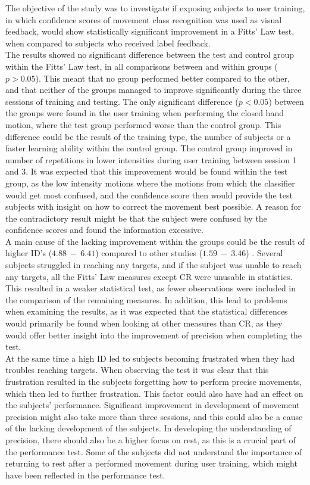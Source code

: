 The objective of the study was to investigate if exposing subjects to user training, in which confidence scores of movement class recognition was used as visual feedback, would show statistically significant improvement in a Fitts' Law test, when compared to subjects who received label feedback. \\
The results showed no significant difference between the test and control group within the Fitts' Law test, in all comparisons between and within groups ($p > 0.05$). This meant that no group performed better compared to the other, and that neither of the groups managed to improve significantly during the three sessions of training and testing. The only significant difference ($p < 0.05$) between the groups were found in the user training when performing the closed hand motion, where the test group performed worse than the control group. This difference could be the result of the training type, the number of subjects or a faster learning ability within the control group. The control group improved in number of repetitions in lower intensities during user training between session 1 and 3. It was expected that this improvement would be found within the test group, as the low intensity motions where the motions from which the classifier would get most confused, and the confidence score then would provide the test subjects with insight on how to correct the movement best possible. A reason for the contradictory result might be that the subject were confused by the confidence scores and found the information excessive. \\
A main cause of the lacking improvement within the groups could be the result of higher ID's ($4.88~-~6.41$) compared to other studies ($1.59~-~3.46$) \cite{Scheme2013, Scheme2013a}. Several subjects struggled in reaching any targets, and if the subject was unable to reach any targets, all the Fitts' Law measures except CR were unusable in statistics. This resulted in a weaker statistical test, as fewer observations were included in the comparison of the remaining measures. In addition, this lead to problems when examining the results, as it was expected that the statistical differences would primarily be found when looking at other measures than CR, as they would offer better insight into the improvement of precision when completing the test.  \\
At the same time a high ID led to subjects becoming frustrated when they had troubles reaching targets. When observing the test it was clear that this frustration resulted in the subjects forgetting how to perform precise movements, which then led to further frustration. This factor could also have had an effect on the subjects' performance. Significant improvement in development of movement precision might also take more than three sessions, and this could also be a cause of the lacking development of the subjects. In developing the understanding of precision, there should also be a higher focus on rest, as this is a crucial part of the performance test. Some of the subjects did not understand the importance of returning to rest after a performed movement during user training, which might have been reflected in the performance test.\\
